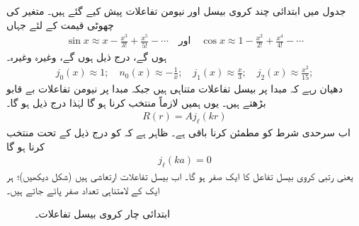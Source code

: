 جدول  میں ابتدائی چند کروی بیسل اور نیومن تفاعلات پیش کیے گئے ہیں۔ متغیر  کی چھوٹی قیمت کے لئے جہاں
\begin{align*}
\sin x\approx x-\frac{x^{3}}{3!}+\frac{x^{5}}{5!}-\dotsb\quad \text{اور}\quad \cos x \approx 1-\frac{x^{2}}{2!}+\frac{x^{4}}{4!}-\dotsb
\end{align*}
 ہوں گے، درج ذیل ہوں گے، وغیرہ وغیرہ۔
\begin{align*}
j_{0}(x)\approx1;\quad{n_{0}(x)\approx-\frac{1}{x}};\quad{j_{1}(x)\approx\frac{x}{3}};\quad{j_{2}(x)\approx\frac{x^{2}}{15}}; 
\end{align*}
 دھیان رہے کہ مبدا پر بیسل تفاعلات متناہی ہیں جبکہ مبدا پر نیومن تفاعلات بے قابو بڑھتے ہیں۔ یوں ہمیں لازماً  منتخب کرنا ہو گا لہٰذا درج ذیل ہو گا۔
\begin{align}
R(r)=Aj_{\ell}(kr) 
\end{align}
اب سرحدی شرط  کو مطمئن کرنا باقی ہے۔ ظاہر ہے کہ  کو درج ذیل کے تحت منتخب کرنا ہو گا
\begin{align}
j_{\ell}(ka)=0
\end{align}
یعنی  رتبی کروی بیسل تفاعل کا  ایک صفر ہو گا۔ اب بیسل تفاعلات ارتعاشی ہیں (شکل  دیکھیں)؛ ہر ایک کے لامتناہی تعداد صفر پائے جاتے ہیں۔
\begin{figure}
\centering
{}
\caption{ابتدائی چار کروی بیسل تفاعلات۔}
\label{شکل_تین_ابعادی_چار_کروی_بیسل_تفاعلات}
\end{figure}




